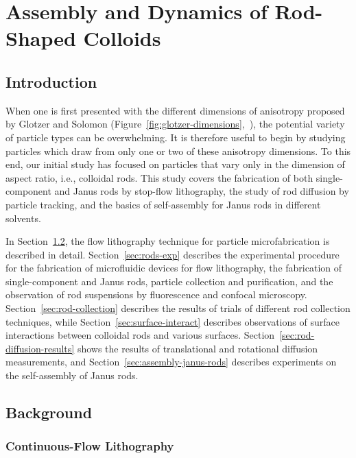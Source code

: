 \chapter{Assembly and Dynamics of Rod-Shaped Colloids}
\label{ch:rods}
\section{Introduction}

When one is first presented with the different dimensions of anisotropy proposed by 
Glotzer and Solomon (Figure~\ref{fig:glotzer-dimensions},~\cite{glotzer-solomon}), the
potential variety of particle types can be overwhelming. It is therefore useful to begin by studying 
particles which draw from only one or two of these anisotropy dimensions. To this end, our
initial study has focused on particles that vary only in the dimension of 
aspect ratio, i.e., colloidal rods. This study covers the fabrication of both single-component and 
Janus rods by stop-flow lithography, the study of rod diffusion by particle tracking, and the basics
of self-assembly for Janus rods in different solvents.

In Section~\ref{sec:rods-background}, the flow lithography technique for particle microfabrication
is described in detail. Section~\ref{sec:rods-exp} describes the experimental procedure for 
the fabrication of microfluidic devices for flow
lithography, the fabrication of single-component and Janus rods,
particle collection and purification,
and the observation of rod suspensions by fluorescence and confocal microscopy. 
Section~\ref{sec:rod-collection} describes the results of trials of different rod collection
techniques, while Section~\ref{sec:surface-interact} describes observations of 
surface interactions between colloidal rods and various surfaces. Section~\ref{sec:rod-diffusion-results}
shows the results of translational and rotational diffusion measurements, and 
Section~\ref{sec:assembly-janus-rods} describes experiments on the 
self-assembly of Janus rods.

\section{Background}
\label{sec:rods-background}

\subsection{Continuous-Flow Lithography}

